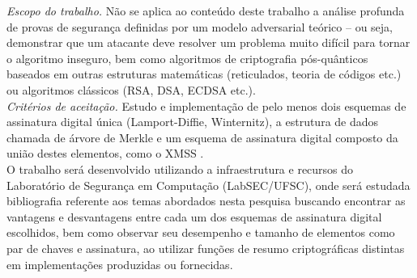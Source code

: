 \documentclass[12pt]{article}
\begin{document}
\noindent \emph{Escopo do trabalho.} Não se aplica ao conteúdo deste trabalho
a análise profunda de provas de segurança definidas por um modelo adversarial
teórico -- ou seja, demonstrar que um atacante deve resolver um problema muito
difícil para tornar o algoritmo inseguro, bem como algoritmos de criptografia
pós-quânticos baseados em outras estruturas matemáticas (reticulados, teoria
de códigos etc.) ou algoritmos clássicos (RSA, DSA, ECDSA etc.). \\

\noindent \emph{Critérios de aceitação.} Estudo e implementação de pelo menos
dois esquemas de assinatura digital única (Lamport-Diffie, Winternitz),
a estrutura de dados chamada de árvore de Merkle e um esquema de assinatura
digital composto da união destes elementos, como o XMSS \cite{Buchmann2011}. \\

O trabalho será desenvolvido utilizando a infraestrutura e recursos do
Laboratório de Segurança em Computação (LabSEC/UFSC), onde será estudada
bibliografia referente aos temas abordados nesta pesquisa buscando encontrar
as vantagens e desvantagens entre cada um dos esquemas de assinatura digital
escolhidos, bem como observar seu desempenho e tamanho de elementos como
par de chaves e assinatura, ao utilizar funções de resumo criptográficas
distintas em implementações produzidas ou fornecidas.



\end{document}
